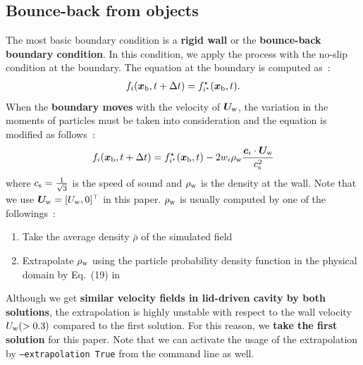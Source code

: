 \subsection{Bounce-back from objects}\label{boundary-wall-settings}
The most basic boundary condition is 
a {\bf rigid wall} or the {\bf bounce-back boundary condition}.
In this condition, we apply the process with the
no-slip condition at the boundary.
The equation at the boundary is computed as~\cite{succi2018lattice}:
\begin{equation}
\begin{aligned}
  f_i(\boldsymbol{x}_{\rm b}, t + \Delta t) = f_{i^\star}^\star(\boldsymbol{x}_{\rm b}, t).
\end{aligned}
\label{discretized-rigid-wall}
\end{equation}
When the {\bf boundary moves} with the velocity of
$\boldsymbol{U}_{\rm w}$, the variation in the moments of particles
must be taken into consideration and the equation is
modified as follows~\cite{succi2018lattice}:
\begin{equation}
  \begin{aligned}
    f_i(\boldsymbol{x}_{\rm b}, t + \Delta t) = f_{i^\star}^\star (\boldsymbol{x}_{\rm b}, t) - 
    2 w_i \rho_{\rm w} \frac{
      \boldsymbol{c}_i \cdot \boldsymbol{U}_{\rm w}
    }{c_{\rm s}^2}
  \end{aligned}
  \label{discretized-moving-wall}
\end{equation}
where $c_{\rm s} = \frac{1}{\sqrt{3}}$ is the speed of sound and 
$\rho_{\rm w}$ is the density at the wall.
Note that we use $\boldsymbol{U}_{\rm w} = [U_{\rm w}, 0]^\top$ in this paper.
$\rho_{\rm w}$ is usually computed by
one of the followings~\cite{zou1997pressure, khajepor2019study}:
\begin{enumerate}
  \item Take the average density $\bar{\rho}$ of the simulated field
  \item Extrapolate $\rho_{\rm w}$ using 
  the particle probability density function in the physical domain by Eq.~(19) in \cite{zou1997pressure}
\end{enumerate}
Although we get {\bf similar velocity fields in lid-driven cavity by both solutions},
the extrapolation is highly unstable with respect to
the wall velocity $U_{\rm w} (> 0.3)$ compared to the first solution.
For this reason, we {\bf take the first solution} for this paper.
Note that we can activate the usage of the extrapolation by
{\tt --extrapolation True} from the command line as well.

